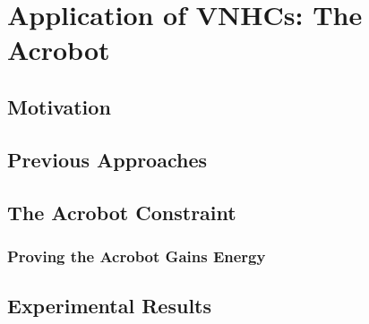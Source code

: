 

\chapter{Application of VNHCs: The Acrobot}\label{ch:acrobot}
\section{Motivation}
\section{Previous Approaches}

\section{The Acrobot Constraint}
\subsection{Proving the Acrobot Gains Energy}

\section{Experimental Results}


































